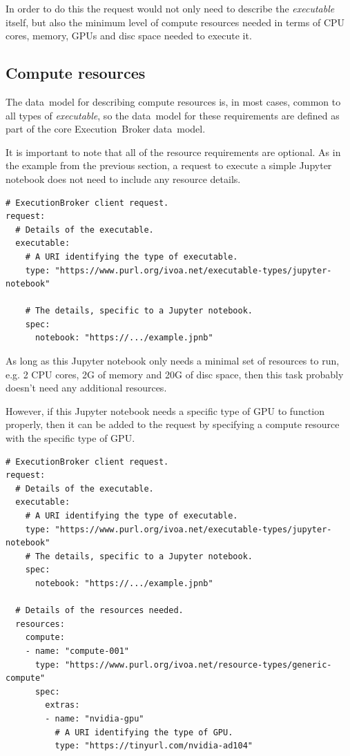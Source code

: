\documentclass[11pt,a4paper]{ivoa}
\newcommand{\datamodel} {data~model}
\newcommand{\executionbroker} {Execution~Broker}
\newcommand{\jupyternotebook} {Jupyter notebook}
\newcommand{\executable} {\textit{executable}}
\newcommand{\cpu}[1] {CPU#1}
\newcommand{\gpu}[1] {GPU#1}
\begin{document}
In order to do this the request would not only need to describe the \executable{} itself,
but also the minimum level of compute resources needed in terms of \cpu{} cores, memory, \gpu{s}
and disc space needed to execute it.

\subsection{Compute resources}
\label{compute-resources}

The \datamodel{} for describing compute resources is, in most cases, common to all types of \executable{},
so the \datamodel{} for these requirements are defined as part of the core \executionbroker{} \datamodel{}.

It is important to note that all of the resource requirements are optional.
As in the example from the previous section, a request to execute a simple \jupyternotebook{}
does not need to include any resource details.

\begin{lstlisting}[]
# ExecutionBroker client request.
request:
  # Details of the executable.
  executable:
    # A URI identifying the type of executable.
    type: "https://www.purl.org/ivoa.net/executable-types/jupyter-notebook"

    # The details, specific to a Jupyter notebook.
    spec:
      notebook: "https://.../example.jpnb"
\end{lstlisting}

As long as this \jupyternotebook{} only needs a minimal set of resources to run, e.g.
2 \cpu{} cores, 2G of memory and 20G of disc space, then this task probably doesn't need
any additional resources.

However, if this \jupyternotebook{} needs a specific type of \gpu{} to function properly,
then it can be added to the request by specifying a compute resource with the specific type
of \gpu{}.

\begin{lstlisting}[]
# ExecutionBroker client request.
request:
  # Details of the executable.
  executable:
    # A URI identifying the type of executable.
    type: "https://www.purl.org/ivoa.net/executable-types/jupyter-notebook"
    # The details, specific to a Jupyter notebook.
    spec:
      notebook: "https://.../example.jpnb"

  # Details of the resources needed.
  resources:
    compute:
    - name: "compute-001"
      type: "https://www.purl.org/ivoa.net/resource-types/generic-compute"
      spec:
        extras:
        - name: "nvidia-gpu"
          # A URI identifying the type of GPU.
          type: "https://tinyurl.com/nvidia-ad104"
\end{lstlisting}
\end{document}
